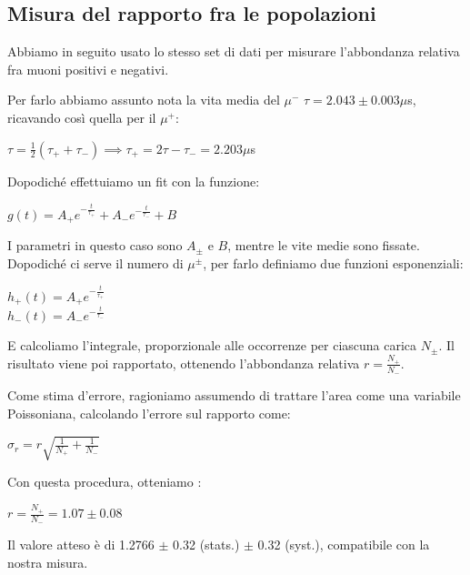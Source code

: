 \documentclass[10pt,a4paper]{article}
\begin{document}

\subsection{Misura del rapporto fra le popolazioni}

Abbiamo in seguito usato lo stesso set di dati per misurare l'abbondanza relativa fra muoni positivi e negativi. 

Per farlo abbiamo assunto nota la vita media del $\mu^{-}$ $\tau= 2.043\pm0.003 \mu$s, ricavando così quella per il $\mu^{+}$: 

\begin{center}
$\tau = \frac{1}{2}(\tau_{+}+\tau_{-}) \implies \tau_{+} = 2\tau -\tau_{-}= 2.203 \mu$s 
\end{center}

Dopodiché effettuiamo un fit con la funzione:

\begin{center}
$g(t) = A_{+}e^{-\frac{t}{\tau_+}}+A_{-}e^{-\frac{t}{\tau_-}} + B$
\end{center}

I parametri in questo caso sono $A_{\pm}$ e $B$, mentre le vite medie sono fissate. Dopodiché ci serve il numero di $\mu^{\pm}$, per farlo definiamo due funzioni esponenziali:

\begin{center}
$h_+(t) = A_+e^{-\frac{t}{\tau_+}}$ 
\\
$h_-(t) = A_-e^{-\frac{t}{\tau_-}}$
\end{center}

E calcoliamo l'integrale, proporzionale alle occorrenze per ciascuna carica $N_{\pm}$. Il risultato viene poi rapportato, ottenendo l'abbondanza relativa $r = \frac{N_+}{N_-}$. 

Come stima d'errore, ragioniamo assumendo di trattare l'area come una variabile Poissoniana, calcolando l'errore sul rapporto come:

\begin{center}
    $\sigma_r = r\sqrt{\frac{1}{N_+}+\frac{1}{N_-}}$
\end{center}

Con questa procedura, otteniamo : 

\begin{center}
$r= \frac{N_+}{N_-} = 1.07 \pm 0.08$
\end{center}

Il valore atteso è di 1.2766 $\pm$ 0.32 (stats.) $\pm$ 0.32 (syst.), compatibile con la nostra misura.
\end{document}
